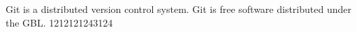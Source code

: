 Git is a distributed version control system.
Git is free software distributed under the GBL.
1212121243124

